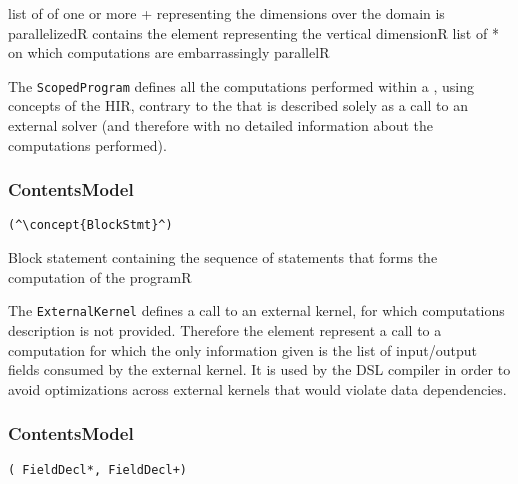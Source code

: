\begin{HIRChildElements}
	{list of of one or more + representing the dimensions 
	 over the domain is parallelized}{R}
	{contains the  element representing the vertical 
	 dimension}{R}
	{list of * on which computations are embarrassingly 
	 parallel}{R}
\end{HIRChildElements}


The {\tt ScopedProgram} defines all the computations performed 
within a , using concepts of the HIR,
 contrary to 
the  that is described solely as 
a call to an external solver (and therefore with no detailed
information about the computations performed).

\subsubsection*{ContentsModel}{}

\begin{lstlisting}[style=default,frame=none]
(^\concept{BlockStmt}^)
\end{lstlisting}

\begin{HIRChildElements}
	{Block statement containing the sequence of statements that forms the computation of the program}{R}
\end{HIRChildElements}


The {\tt ExternalKernel} defines a call to an external kernel, for which computations description is not provided. 
Therefore the element represent a call to a computation for
which the only information given is the list of input/output 
fields consumed by the external kernel. 
It is used by the DSL compiler in order to avoid optimizations
across external kernels that would violate data dependencies.


\subsubsection*{ContentsModel}{}

\begin{lstlisting}[style=default,frame=none]
( FieldDecl*, FieldDecl+)
\end{lstlisting}

